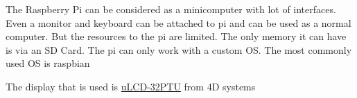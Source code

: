 \documentclass[12pt, a4paper, twoside]{article}
\begin{document}
The Raspberry Pi can be considered as a minicomputer with lot of interfaces. Even a monitor and keyboard can be attached to pi and can be used as a normal computer. But the resources to the pi are limited. The only memory it can have is via an SD Card. The pi can only work with a custom OS. The most commonly used OS is raspbian \cite{bib_raspbian}

The display that is used is \href{http://www.4dsystems.com.au/product/uLCD_32PTU/}{uLCD-32PTU} from 4D systems \cite{bib_ulcd}



 
\end{document}
